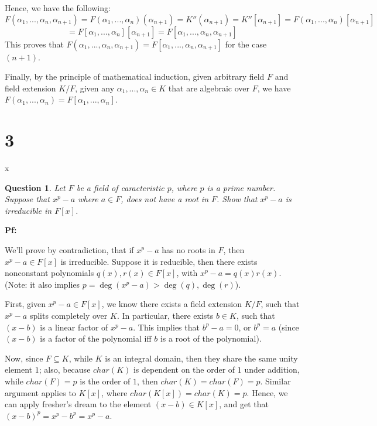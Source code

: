 \documentclass{article}
\newtheorem{question}{Question}
\begin{document}
Hence, we have the following:
$$F(\alpha_1,...,\alpha_n,\alpha_{n+1})=F(\alpha_1,...,\alpha_n)(\alpha_{n+1})=K''(\alpha_{n+1})=K''[\alpha_{n+1}] = F(\alpha_1,...,\alpha_n)[\alpha_{n+1}]$$
$$= F[\alpha_1,...,\alpha_n][\alpha_{n+1}]=F[\alpha_1,...,\alpha_n,\alpha_{n+1}]$$
This proves that $F(\alpha_1,...,\alpha_n,\alpha_{n+1})=F[\alpha_1,...,\alpha_n,\alpha_{n+1}]$ for the case $(n+1)$.

\hfil

Finally, by the principle of mathematical induction, given arbitrary field $F$ and field extension $K/F$, given any $\alpha_1,...,\alpha_n\in K$ that are algebraic over $F$, we have $F(\alpha_1,...,\alpha_n)=F[\alpha_1,...,\alpha_n]$.

\break

\section*{3}x
\begin{myBox}[]{}
    \begin{question}
        Let $F$ be a field of caracteristic $p$, where $p$ is a prime number. Suppose that $x^p-a$ where $a\in F$, does not have a root in $F$. 
        Show that $x^p-a$ is irreducible in $F[x]$.
    \end{question}
\end{myBox}

\textbf{Pf:}

We'll prove by contradiction, that if $x^p-a$ has no roots in $F$, then $x^p-a\in F[x]$ is irreducible. Suppose it is reducible, then there exists nonconstant polynomials $q(x),r(x)\in F[x]$, with $x^p-a=q(x)r(x)$.
(Note: it also implies $p=\deg(x^p-a)>\deg(q),\deg(r)$).

\hfil

First, given $x^p-a\in F[x]$, we know there exists a field extension $K/F$, such that $x^p-a$ splits completely over $K$. In particular, there exists $b\in K$, such that $(x-b)$ is a linear factor of $x^p-a$.
This implies that $b^p-a=0$, or $b^p=a$ (since $(x-b)$ is a factor of the polynomial iff $b$ is a root of the polynomial).

Now, since $F\subseteq K$, while $K$ is an integral domain, then they share the same unity element $1$; also, because $char(K)$ is dependent on the order of $1$ under addition, while $char(F)=p$ is the order of $1$,
then $char(K)=char(F)=p$. Similar argument applies to $K[x]$, where $char(K[x])=char(K)=p$. Hence, we can apply fresher's dream to the element $(x-b)\in K[x]$,
and get that $(x-b)^p=x^p-b^p=x^p-a$.
\end{document}
